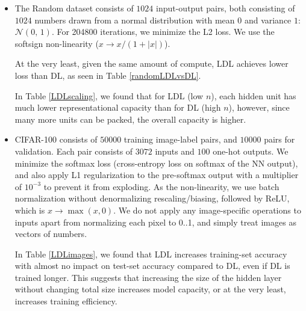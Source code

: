 \documentclass{article}
\begin{document}
\begin{itemize}
\item The Random dataset consists of $1024$ input-output pairs, both consisting of $1024$ numbers drawn from a normal distribution with mean $0$ and variance $1$: $\mathcal{N}(0,\,1)$. For 204800 iterations, we minimize the L2 loss. We use the softsign non-linearity ($x \rightarrow x/(1+|x|)$).

At the very least, given the same amount of compute, LDL achieves lower loss than DL, as seen in Table \ref{randomLDLvsDL}.

In Table \ref{LDLscaling}, we found that for LDL (low $n$), each hidden unit has much lower representational capacity than for DL (high $n$), however, since many more units can be packed, the overall capacity is higher.

\item CIFAR-100 consists of $50000$ training image-label pairs, and $10000$ pairs for validation. Each pair consists of $3072$ inputs and $100$ one-hot outputs. We minimize the softmax loss (cross-entropy loss on softmax of the NN output), and also apply L1 regularization to the pre-softmax output with a multiplier of $10^{-3}$ to prevent it from exploding. As the non-linearity, we use batch normalization \cite{ioffe2015batch} without denormalizing rescaling/biasing, followed by ReLU, which is $x \rightarrow \max(x,0)$. We do not apply any image-specific operations to inputs apart from normalizing each pixel to 0..1, and simply treat images as vectors of numbers.

In Table \ref{LDLimages}, we found that LDL increases training-set accuracy with almost no impact on test-set accuracy compared to DL, even if DL is trained longer. This suggests that increasing the size of the hidden layer without changing total size increases model capacity, or at the very least, increases training efficiency.
\end{itemize}
\end{document}
